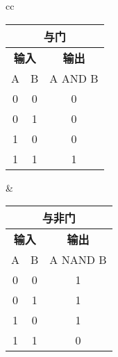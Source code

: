 \begin{tabular}{cc}%
    \begin{tabular}{|c|c|c|}
        \multicolumn{3}{c}{\textbf{与门}} \\
        \hline
        \multicolumn{2}{|c|}{\textbf{输入}} & \textbf{输出} \\
        \hline
        A & B & A AND B \\
        \hline
        \num{0} & \num{0} & \num{0} \\
        \hline
        \num{0} & \num{1} & \num{0} \\
        \hline
        \num{1} & \num{0} & \num{0} \\
        \hline
        \num{1} & \num{1} & \num{1} \\
        \hline
    \end{tabular} &
    \begin{tabular}{|c|c|c|}
        \multicolumn{3}{c}{\textbf{与非门}} \\
        \hline
        \multicolumn{2}{|c|}{\textbf{输入}} & \textbf{输出} \\
        \hline
        A & B & A NAND B \\
        \hline
        \num{0} & \num{0} & \num{1} \\
        \hline
        \num{0} & \num{1} & \num{1} \\
        \hline
        \num{1} & \num{0} & \num{1} \\
        \hline
        \num{1} & \num{1} & \num{0} \\
        \hline
    \end{tabular} \tabularnewline
\end{tabular}

\bigskip


